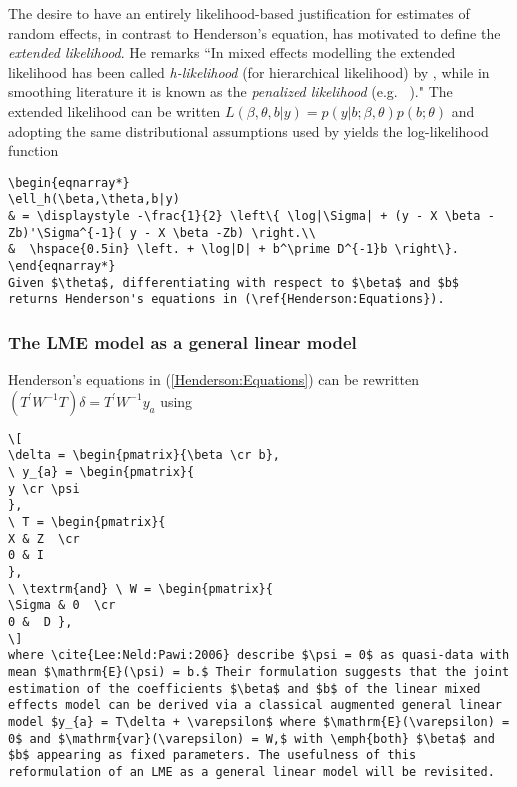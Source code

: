 \documentclass[MAIN.tex]{subfiles}
\begin{document}
The desire to have an entirely likelihood-based justification for estimates of random effects, in contrast to Henderson's equation, has motivated \citet[page 429]{Pawi:in:2001} to define the \emph{extended likelihood}. He remarks ``In mixed effects modelling the extended likelihood has been called \emph{h-likelihood} (for hierarchical  likelihood) by \cite{Lee:Neld:hier:1996}, while in smoothing literature it is known as the \emph{penalized likelihood} (e.g.\ \citeauthor{Gree:Silv:nonp:1994} \citeyear{Gree:Silv:nonp:1994})." The extended likelihood can be written $L(\beta,\theta,b|y) = p(y|b;\beta,\theta) p(b;\theta)$ and adopting the same distributional assumptions used by \cite{Henderson:1950} yields the log-likelihood function
\begin{verbatim}
\begin{eqnarray*}
\ell_h(\beta,\theta,b|y)
& = \displaystyle -\frac{1}{2} \left\{ \log|\Sigma| + (y - X \beta -Zb)'\Sigma^{-1}( y - X \beta -Zb) \right.\\
&  \hspace{0.5in} \left. + \log|D| + b^\prime D^{-1}b \right\}.
\end{eqnarray*}
Given $\theta$, differentiating with respect to $\beta$ and $b$ returns Henderson's equations in (\ref{Henderson:Equations}).
\end{verbatim}
\subsubsection{The LME model as a general linear model}
Henderson's equations in (\ref{Henderson:Equations}) can be rewritten $( T^\prime W^{-1} T ) \delta = T^\prime W^{-1} y_{a} $ using
\begin{verbatim}
\[
\delta = \begin{pmatrix}{\beta \cr b},
\ y_{a} = \begin{pmatrix}{
y \cr \psi
},
\ T = \begin{pmatrix}{
X & Z  \cr
0 & I
},
\ \textrm{and} \ W = \begin{pmatrix}{
\Sigma & 0  \cr
0 &  D },
\]
where \cite{Lee:Neld:Pawi:2006} describe $\psi = 0$ as quasi-data with mean $\mathrm{E}(\psi) = b.$ Their formulation suggests that the joint estimation of the coefficients $\beta$ and $b$ of the linear mixed effects model can be derived via a classical augmented general linear model $y_{a} = T\delta + \varepsilon$ where $\mathrm{E}(\varepsilon) = 0$ and $\mathrm{var}(\varepsilon) = W,$ with \emph{both} $\beta$ and $b$ appearing as fixed parameters. The usefulness of this reformulation of an LME as a general linear model will be revisited.

\end{verbatim}
















\end{document}
